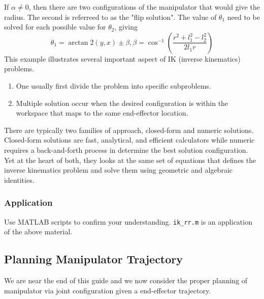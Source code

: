 \documentclass[letterpaper]{article}
\begin{document}
If $\alpha \neq 0$, then there are two configurations of the manipulator that would give the radius.
The second is referreed to as the "flip solution". The value of $\theta_1$ need to be solved
for each possible value for $\theta_2$, giving
\begin{equation*}
  \theta_1 = \arctan2(y,x) \pm \beta, \beta = \cos^{-1}\left(\frac{r^2+l_1^2-l_2^2}{2l_1r}\right)
\end{equation*}
This example illustrates several important aspect of IK (inverse kinematics) problems.
\begin{enumerate}
  \item One usually first divide the problem into specific subproblems. 
  \item Multiple solution occur when the desired configuration is within the workspace that
  maps to the same end-effector location. 
\end{enumerate}

There are typically two families of approach, closed-form and numeric solutions. 
Closed-form solutions are fast, analytical, and efficient calculators while numeric
requires a back-and-forth process in determine the best solution configuration. 
Yet at the heart of both, they looks at the same set of equations that defines the 
inverse kinematics problem and solve them using geometric and algebraic identities. 

\subsubsection{Application}
Use MATLAB scripts to confirm your understanding. \texttt{ik\_rr.m} is an application
of the above material. 

\subsection{Planning Manipulator Trajectory}
We are near the end of this guide and we now consider the proper planning of manipulator
via joint configuration given a end-effector trajectory.
\end{document}
